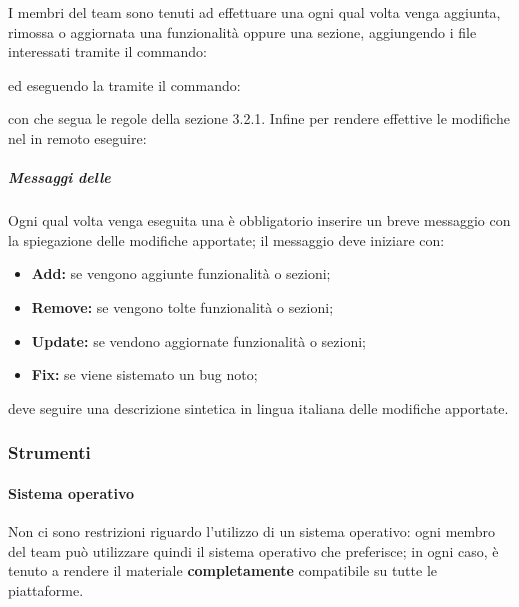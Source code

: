 			I membri del team sono tenuti ad effettuare una  ogni qual volta venga aggiunta, rimossa o aggiornata una funzionalità oppure una sezione, aggiungendo i file interessati tramite il commando:
			\begin{center}
			\end{center}
			ed eseguendo la  tramite il commando:
			\begin{center}
			\end{center}
			con  che segua le regole della sezione 3.2.1.
			Infine per rendere effettive le modifiche nel  in remoto eseguire:
			\begin{center}
			\end{center}
		\subparagraph{Messaggi delle }
		\label{sec:4.1.3.1.4}
			Ogni qual volta venga eseguita una  è obbligatorio inserire un breve messaggio con la spiegazione
			delle modifiche apportate; il messaggio deve iniziare con:
			\begin{itemize}
				\item \textbf{Add:} se vengono aggiunte funzionalità o sezioni;
				\item \textbf{Remove:} se vengono tolte funzionalità o sezioni;
				\item \textbf{Update:} se vendono aggiornate funzionalità o sezioni;
				\item \textbf{Fix:} se viene sistemato un bug noto;
			\end{itemize}
			deve seguire una descrizione sintetica in lingua italiana delle modifiche apportate.
\subsubsection{Strumenti}
\label{sec:4.1.4}
	\paragraph{Sistema operativo}
	\label{sec:4.1.4.1}
		Non ci sono restrizioni riguardo l'utilizzo di un sistema operativo: ogni membro del team può utilizzare quindi il sistema operativo che preferisce; in ogni caso, è tenuto a rendere il materiale  \textbf{completamente} compatibile su tutte le piattaforme.
